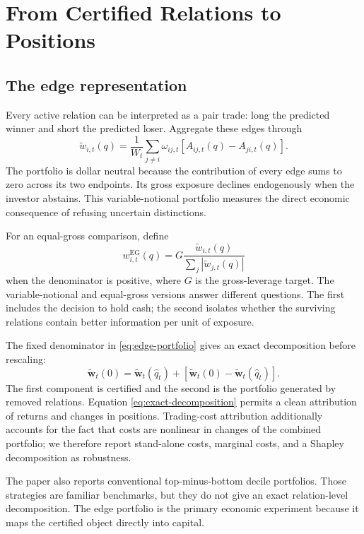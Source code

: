 \section{From Certified Relations to Positions}
\label{sec:portfolio}

\subsection{The edge representation}

Every active relation can be interpreted as a pair trade: long the predicted winner and short the predicted loser. Aggregate these edges through
\begin{equation}
\widetilde w_{i,t}(q)
=
\frac{1}{W_t}
\sum_{j\neq i}
\omega_{ij,t}
\left[
A_{ij,t}(q)-A_{ji,t}(q)
\right].
\label{eq:edge-portfolio}
\end{equation}
The portfolio is dollar neutral because the contribution of every edge sums to zero across its two endpoints. Its gross exposure declines endogenously when the investor abstains. This variable-notional portfolio measures the direct economic consequence of refusing uncertain distinctions.

For an equal-gross comparison, define
\[
w_{i,t}^{\mathrm{EG}}(q)
=
G
\frac{\widetilde w_{i,t}(q)}{
\sum_j|\widetilde w_{j,t}(q)|
}
\]
when the denominator is positive, where $G$ is the gross-leverage target. The variable-notional and equal-gross versions answer different questions. The first includes the decision to hold cash; the second isolates whether the surviving relations contain better information per unit of exposure.

The fixed denominator in \eqref{eq:edge-portfolio} gives an exact decomposition before rescaling:
\begin{equation}
\widetilde{\bm w}_t(0)
=
\widetilde{\bm w}_t(\widehat q_t)
+
\left[
\widetilde{\bm w}_t(0)
-
\widetilde{\bm w}_t(\widehat q_t)
\right].
\label{eq:exact-decomposition}
\end{equation}
The first component is certified and the second is the portfolio generated by removed relations. Equation \eqref{eq:exact-decomposition} permits a clean attribution of returns and changes in positions. Trading-cost attribution additionally accounts for the fact that costs are nonlinear in changes of the combined portfolio; we therefore report stand-alone costs, marginal costs, and a Shapley decomposition as robustness.

The paper also reports conventional top-minus-bottom decile portfolios. Those strategies are familiar benchmarks, but they do not give an exact relation-level decomposition. The edge portfolio is the primary economic experiment because it maps the certified object directly into capital.

